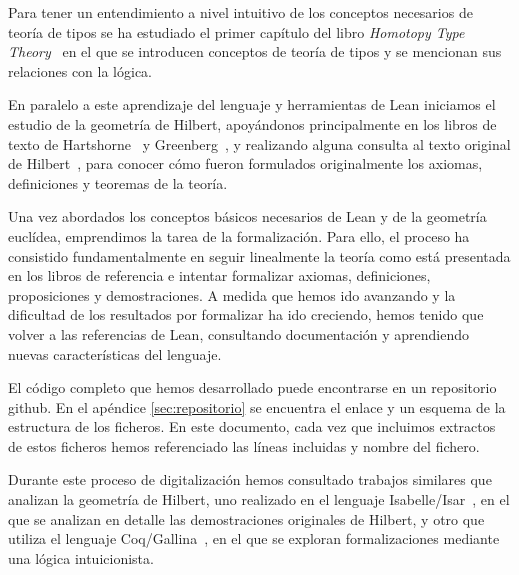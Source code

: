 Para tener un entendimiento a nivel intuitivo de los conceptos necesarios de
teoría de tipos se ha estudiado el primer capítulo del libro \textit{Homotopy
	Type Theory}~\cite{HomotopyTypeTheory} en el que se introducen conceptos de
teoría de tipos y se mencionan sus relaciones con la lógica.

En paralelo a este aprendizaje del lenguaje y herramientas de Lean iniciamos el
estudio de la geometría de Hilbert, apoyándonos principalmente en los libros de
texto de Hartshorne~\cite{hartshorneGeometryEuclid2000} y
Greenberg~\cite{greenbergEuclideanNonEuclideanGeometries1993}, y realizando
alguna consulta al texto original de Hilbert~\cite{hilbertFoundationsGeometry1950},
para conocer cómo fueron formulados originalmente los axiomas, definiciones y
teoremas de la teoría.

Una vez abordados los conceptos básicos necesarios de Lean y de la
geometría euclídea, emprendimos la tarea de la formalización. Para ello, el
proceso ha consistido fundamentalmente en seguir linealmente la teoría como está
presentada en los libros de referencia e intentar formalizar axiomas,
definiciones, proposiciones y demostraciones. A medida que hemos ido avanzando
y la dificultad de los resultados por formalizar ha ido creciendo, hemos tenido
que volver a las referencias de Lean, consultando documentación y
aprendiendo nuevas características del lenguaje.

El código completo que hemos desarrollado puede encontrarse en un repositorio
github. En el apéndice \ref{sec:repositorio} se encuentra el enlace y un esquema
de la estructura de los ficheros. En este documento, cada vez que incluimos
extractos de estos ficheros hemos referenciado las líneas incluidas y nombre del
fichero.

Durante este proceso de digitalización hemos consultado trabajos similares que
analizan la geometría de Hilbert, uno realizado en el lenguaje
Isabelle/Isar~\cite{meikleFormalizingHilbertGrundlagen2003}, en el que
se analizan en detalle las demostraciones originales de Hilbert, y otro
que utiliza el lenguaje Coq/Gallina~\cite{dehlinger2001higher}, en el
que se exploran formalizaciones mediante una lógica intuicionista.







